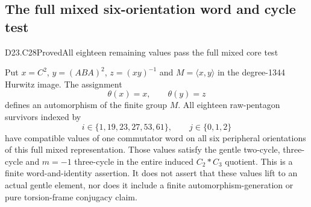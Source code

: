 \subsection{The full mixed six-orientation word and cycle test}

\begin{statement}{D23.C28}{Proved}{All eighteen remaining values pass the full mixed core test}
\end{statement}
Put $x=C^2$, $y=(ABA)^2$, $z=(xy)^{-1}$ and
$M=\langle x,y\rangle$ in the degree-1344 Hurwitz image.
The assignment
\[
                 \theta(x)=x,\qquad\theta(y)=z
                                                               \tag{D23.C28.1}
\]
defines an automorphism of the finite group $M$.
All eighteen raw-pentagon survivors indexed by
\[
        i\in\{1,19,23,27,53,61\},\qquad j\in\{0,1,2\}
\]
have compatible values of one commutator word on all six
peripheral orientations of this full mixed representation.
Those values satisfy the gentle two-cycle, three-cycle and
$m=-1$ three-cycle in the entire induced $C_2*C_3$ quotient.
This is a finite word-and-identity assertion.  It does not
assert that these values lift to an actual gentle element,
nor does it include a finite automorphism-generation or
pure torsion-frame conjugacy claim.

